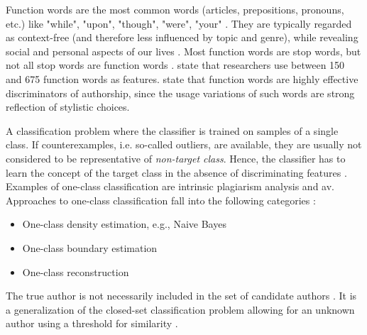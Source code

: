 \begin{definition}
    Function words are the most common words (articles, prepositions, pronouns, etc.) 
    like "while", "upon", "though", "were", "your" \cite{stamatatos_survey_2009,elmanarelbouanani_authorship_2014}.
    They are typically regarded as context-free (and therefore less influenced by topic and genre), 
    while revealing social and personal aspects of our lives \cite{neal_surveying_2018}.
    Most function words are stop words, but not all stop words are function words \cite{stein_intrinsic_2011}.
    \citet{elmanarelbouanani_authorship_2014} state that researchers use between 150 and 675 function words as features.
    \citet{abbasi_writeprints_2008} state that function words are highly effective discriminators of authorship, since 
    the usage variations of such words are strong reflection of stylistic choices.
\end{definition}

\begin{definition}
    A classification problem where the classifier is trained on samples of a single class.
    If counterexamples, i.e. so-called outliers, are available, they are usually not considered to be representative of \textit{non-target class}.
    Hence, the classifier has to learn the concept of the target class in the absence of discriminating features 
    \cite{stein_intrinsic_2011,koppel_authorship_2004}.
    Examples of one-class classification are intrinsic plagiarism analysis and \ac{av}.
    Approaches to one-class classification fall into the following categories \cite{stein_intrinsic_2011}:
    \begin{itemize}
        \item One-class density estimation, e.g., Naive Bayes
        \item One-class boundary estimation
        \item One-class reconstruction
    \end{itemize}
\end{definition}

\begin{definition}
    The true author is not necessarily included in the set of candidate authors \cite{stamatatos_survey_2009,barlas_cross_domain_2020,neal_surveying_2018}.
    It is a generalization of the closed-set classification problem allowing for an unknown author using a threshold for similarity \cite{neal_surveying_2018}.
\end{definition}

